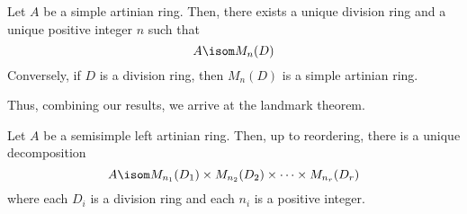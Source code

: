 \documentclass[11pt,leqno,oneside]{amsbook}
\numberwithin{thm}{section}
\begin{document}
\begin{thm}[Wedderburn]
  Let \(A\) be a simple artinian ring. Then, there exists a unique
  division ring and a unique positive integer \(n\) such that \[
    A \isom M_n(D)
  \]
  Conversely, if \(D\) is a division ring, then \(M_n(D)\) is a simple
  artinian ring. 
\end{thm}
Thus, combining our results, we arrive at the landmark theorem.
\begin{thm}
  Let \(A\) be a semisimple left artinian ring. Then, up to reordering,
  there is a unique decomposition \[
    A \isom M_{n_1}(D_1) \times M_{n_2}(D_2) \times \cdots \times M_{n_r}(D_r)
  \]
  where each \(D_i\) is a division ring and each \(n_i\) is a positive
  integer.
\end{thm}
\begin{bibdiv}
  \begin{biblist}
  \end{biblist}
\end{bibdiv}
\end{document}
